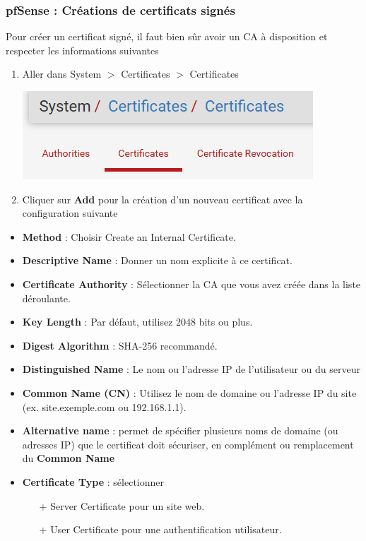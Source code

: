 \documentclass[french, 12pt]{article}%
\newcommand{\itemE}{\item[$\bullet$]}
\begin{document}
\subsubsection{pfSense : Créations de certificats signés}

Pour créer un certificat signé, il faut bien sûr avoir un CA à disposition et respecter les informations suivantes


\begin{enumerate}
\item Aller dans System $>$ Certificates $>$ Certificates

\begin{center}
\includegraphics[scale=0.7]{./ressource/certificatPfsense}
\end{center}

\item Cliquer sur \textbf{Add} pour la création d'un nouveau certificat avec la configuration suivante
\end{enumerate}

\begin{itemize}
\itemE \textbf{Method} : Choisir Create an Internal Certificate.
\itemE \textbf{Descriptive Name} : Donner un nom explicite à ce certificat.
\itemE \textbf{Certificate Authority} : Sélectionner la CA que vous avez créée dans la liste déroulante.
\itemE \textbf{Key Length} : Par défaut, utilisez 2048 bits ou plus.
\itemE \textbf{Digest Algorithm} : SHA-256 recommandé.

\itemE \textbf{Distinguished Name} : Le nom ou l'adresse IP de l'utilisateur ou du serveur
\itemE \textbf{Common Name (CN)} : Utilisez le nom de domaine ou l'adresse IP du site (ex. site.exemple.com ou 192.168.1.1).
\itemE \textbf{Alternative name} : permet de spécifier plusieurs noms de domaine (ou adresses IP) que le certificat doit sécuriser, en complément ou remplacement du \textbf{Common Name}
\itemE \textbf{Certificate Type} : sélectionner
	\begin{itemize}
	\item[+] Server Certificate pour un site web.
	\item[+] User Certificate pour une authentification utilisateur.
	\end{itemize}

\end{itemize}
\end{document}
